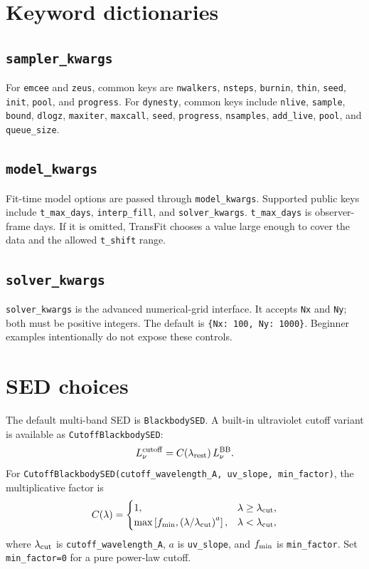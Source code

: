 \documentclass[11pt]{article}
\begin{document}
\section{Keyword dictionaries}

\subsection{\texttt{sampler\_kwargs}}

For \texttt{emcee} and \texttt{zeus}, common keys are \texttt{nwalkers},
\texttt{nsteps}, \texttt{burnin}, \texttt{thin}, \texttt{seed},
\texttt{init}, \texttt{pool}, and \texttt{progress}.  For \texttt{dynesty},
common keys include \texttt{nlive}, \texttt{sample}, \texttt{bound},
\texttt{dlogz}, \texttt{maxiter}, \texttt{maxcall}, \texttt{seed},
\texttt{progress}, \texttt{nsamples}, \texttt{add\_live}, \texttt{pool}, and
\texttt{queue\_size}.

\subsection{\texttt{model\_kwargs}}

Fit-time model options are passed through \texttt{model\_kwargs}.  Supported
public keys include \texttt{t\_max\_days}, \texttt{interp\_fill}, and
\texttt{solver\_kwargs}.  \texttt{t\_max\_days} is observer-frame days.  If it
is omitted, TransFit chooses a value large enough to cover the data and the
allowed \texttt{t\_shift} range.

\subsection{\texttt{solver\_kwargs}}

\texttt{solver\_kwargs} is the advanced numerical-grid interface.  It accepts
\texttt{Nx} and \texttt{Ny}; both must be positive integers.  The default is
\texttt{\{Nx: 100, Ny: 1000\}}.  Beginner examples intentionally do not expose
these controls.

\section{SED choices}

The default multi-band SED is \texttt{BlackbodySED}.  A built-in ultraviolet
cutoff variant is available as \texttt{CutoffBlackbodySED}:
\[
  L_\nu^{\rm cutoff}=C(\lambda_{\rm rest})\,L_\nu^{\rm BB}.
\]
For \texttt{CutoffBlackbodySED(cutoff\_wavelength\_A, uv\_slope,
min\_factor)}, the multiplicative factor is
\[
C(\lambda)=
\begin{cases}
1, & \lambda \ge \lambda_{\rm cut},\\
\max\left[f_{\rm min},\left(\lambda/\lambda_{\rm cut}\right)^{a}\right],
& \lambda < \lambda_{\rm cut},
\end{cases}
\]
where $\lambda_{\rm cut}$ is \texttt{cutoff\_wavelength\_A},
$a$ is \texttt{uv\_slope}, and $f_{\rm min}$ is \texttt{min\_factor}.
Set \texttt{min\_factor=0} for a pure power-law cutoff.
\end{document}
